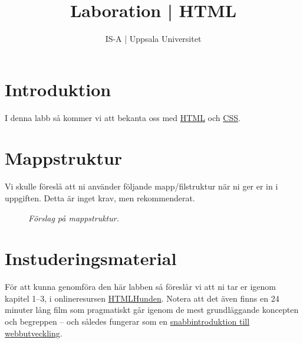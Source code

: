 \documentclass{article}
\begin{document}
  \title{ Laboration | HTML }
  \author{ IS-A | Uppsala Universitet }
  \date{}
  \maketitle

  \lstset{language=XML}







\section*{Introduktion}
I denna labb så kommer vi att bekanta oss med \href{http://en.wikipedia.org/wiki/HTML}{HTML} och \href{http://en.wikipedia.org/wiki/Cascading_Style_Sheets}{CSS}.


\section{Mappstruktur}
Vi skulle föreslå att ni använder följande mapp/filstruktur när ni ger er in i uppgiften. Detta är inget krav, men rekommenderat.



\begin{figure}[h]
  \centering
  

  \caption{\emph{Förslag på mappstruktur.}}
\end{figure}





\section{Instuderingsmaterial}
För att kunna genomföra den här labben så föreslår vi att ni tar er igenom kapitel 1--3, i onlineresursen \href{http://htmlhunden.se/dist/toc.html}{HTMLHunden}. Notera att det även finns en 24 minuter lång film som pragmatiskt går igenom de mest grundläggande koncepten och begreppen -- och således fungerar som en \href{http://htmlhunden.se/dist/02-00-html-intro.html}{snabbintroduktion till webbutveckling}.
\end{document}
